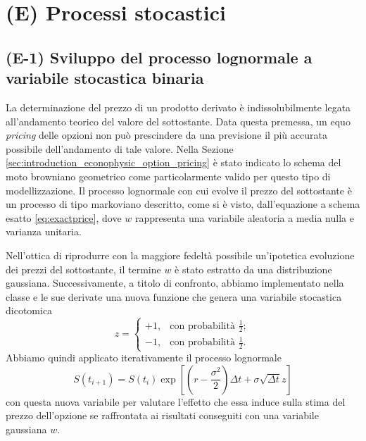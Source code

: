 \chapter{(E) Processi stocastici} \label{cap:bimodal}

\section{(E-1) Sviluppo del processo lognormale a variabile stocastica binaria}

La determinazione del prezzo di un prodotto derivato è indissolubilmente legata all'andamento teorico del valore del sottostante. Data questa premessa, un equo \textit{pricing} delle opzioni non può prescindere da una previsione il più accurata possibile dell'andamento di tale valore. Nella Sezione \ref{sec:introduction_econophysic_option_pricing} è stato indicato lo schema del moto browniano geometrico come particolarmente valido per questo tipo di modellizzazione. Il processo lognormale con cui evolve il prezzo del sottostante è un processo di tipo markoviano descritto, come si è visto, dall'equazione a schema esatto \eqref{eq:exactprice}, dove $w$ rappresenta una variabile aleatoria a media nulla e varianza unitaria.

Nell'ottica di riprodurre con la maggiore fedeltà possibile un'ipotetica evoluzione dei prezzi del sottostante, il termine $w$ è stato estratto da una distribuzione gaussiana. Successivamente, a titolo di confronto, abbiamo implementato nella classe  e le sue derivate una nuova funzione  che genera una variabile stocastica dicotomica
\begin{equation}
    z = \begin{cases}
    +1, & \text{con probabilità} \,\, \frac{1}{2};\\
    -1, & \text{con probabilità} \,\, \frac{1}{2}.
  \end{cases}
    \label{eq:binary_variable}
\end{equation}
Abbiamo quindi applicato iterativamente il processo lognormale 
\begin{equation}
    S\left(t_{i+1}\right) = S(t_i) \exp{\left[\left(r - \frac{\sigma^2}{2}\right) \Delta t + \sigma \sqrt{\Delta t} z\right]}
    \label{eq:bimodal_price}
\end{equation}
con questa nuova variabile per valutare l'effetto che essa induce sulla stima del prezzo dell'opzione se raffrontata ai risultati conseguiti con una variabile gaussiana $w$.

